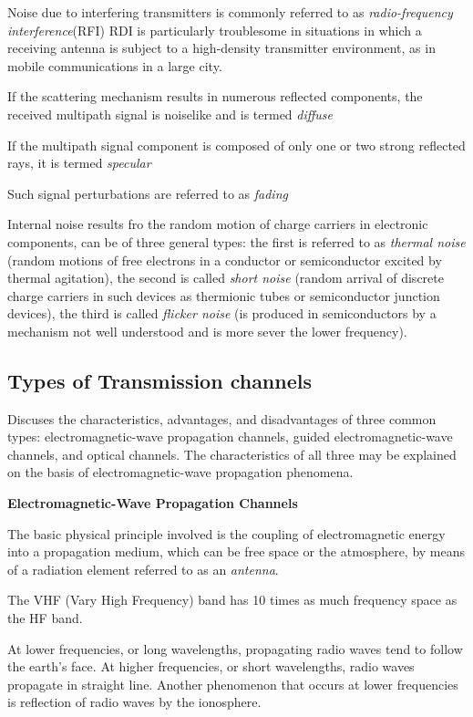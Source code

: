 \documentclass[12pt,a4paper]{book}
\begin{document}
Noise due to interfering transmitters is commonly referred to as \textit{radio-frequency interference}(RFI)
RDI is particularly troublesome in situations in which a receiving antenna is subject to a high-density transmitter environment,
as in mobile communications in a large city.

If the scattering mechanism results in numerous reflected components, the received multipath signal is noiselike and is termed \textit{diffuse}

If the multipath signal component is composed of only one or two strong reflected rays, it is termed \textit{specular}

Such signal perturbations are referred to as \textit{fading}

Internal noise results fro the random motion of charge carriers in electronic components, can be of three general types: the first is referred to as \textit{thermal noise} (random motions of free electrons in a conductor or semiconductor excited by thermal agitation), the second is called \textit{short noise} (random arrival of discrete charge carriers in such devices as thermionic tubes or semiconductor junction devices), the third is called \textit{flicker noise} (is produced in semiconductors by a mechanism not well understood and is more sever the lower frequency).

\subsection{Types of Transmission channels}
Discuses the characteristics, advantages, and disadvantages of three common types: electromagnetic-wave propagation channels, guided electromagnetic-wave channels, and optical channels.
The characteristics of all three may be explained on the basis of electromagnetic-wave propagation phenomena.

\textbf{Electromagnetic-Wave Propagation Channels}

The basic physical principle involved is the coupling of electromagnetic energy into a propagation medium,
which can be free space or the atmosphere, by means of a radiation element referred to as an \textit{antenna}.

The VHF (Vary High Frequency) band has 10 times as much frequency space as the HF band.

At lower frequencies, or long wavelengths, propagating radio waves tend to follow the earth's face. At higher frequencies, or short wavelengths, radio waves propagate in straight line.
Another phenomenon that occurs at lower frequencies is reflection of radio waves by the ionosphere.
\end{document}
